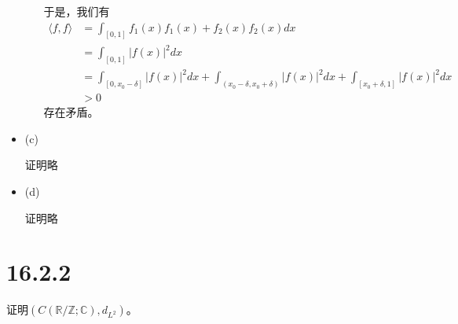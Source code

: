 \documentclass{article}
\begin{document}
\begin{itemize}
\begin{itemize}
                于是，我们有
                \begin{align*}
                  \langle f, f \rangle & = \int_{[0, 1]} f_1(x)f_1(x) + f_2(x)f_2(x)dx \\
                                       & = \int_{[0, 1]} |f(x)|^2 dx                   \\
                                       & = \int_{[0, x_0 - \delta]} |f(x)|^2 dx
                  + \int_{(x_0 - \delta, x_0 + \delta)} |f(x)|^2 dx
                  + \int_{[x_0 + \delta, 1]} |f(x)|^2 dx                               \\
                                       & > 0
                \end{align*}
                存在矛盾。

        \end{itemize}

  \item (c)

        证明略

  \item (d)

        证明略
\end{itemize}

\section*{16.2.2}

证明$(C(\mathbb{R}/\mathbb{Z};\mathbb{C}), d_{L^2})$。
\end{document}
